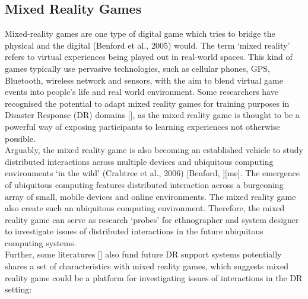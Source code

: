 \subsection{Mixed Reality Games}
Mixed-reality games are one type of digital game which tries to bridge the physical and the digital (Benford et al., 2005) would. The term `mixed reality' refers to virtual experiences being played out in real-world spaces. This kind of games typically use pervasive technologies, such as cellular phones, GPS, Bluetooth, wireless network and sensors, with the aim to blend virtual game events into people's life and real world environment. Some researchers have recognised the potential to adapt mixed reality games for training purposes in Disaster Response (DR) domains [], as the mixed reality game is thought to be a powerful way of exposing participants to learning experiences not otherwise possible. \\

Arguably, the mixed reality game is also becoming an established vehicle to study distributed interactions across multiple devices and ubiquitous computing environments `in the wild' (Crabtree et al., 2006) [Benford, ][me]. The emergence of ubiquitous computing features distributed interaction across a burgeoning array of small, mobile devices and online environments. The mixed reality game also create such an ubiquitous computing environment. Therefore, the mixed reality game can serve as research `probes' for ethnographer and system designer to investigate issues of distributed interactions in the future ubiquitous computing systems.\\

Further, some literatures [] also fund future DR support systems potentially shares a set of characteristics with mixed reality games, which suggests mixed reality game could be a platform for investigating issues of interactions in the DR setting:\\

